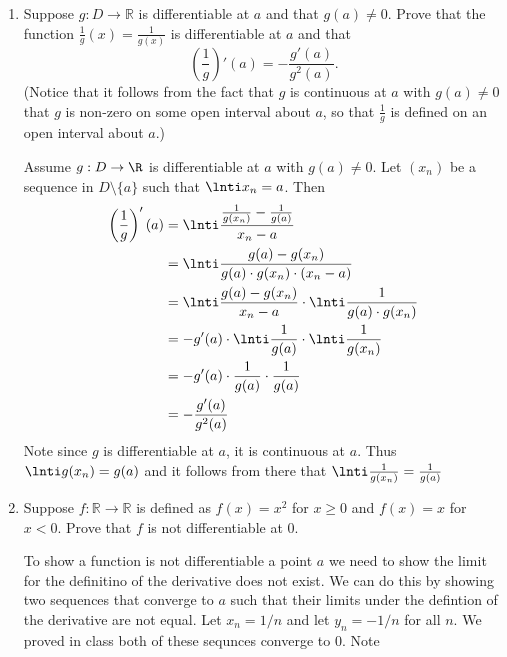 \documentclass[11pt]{exam}
\begin{document}
\begin{enumerate}
        \item Suppose \(g: D \rightarrow \mathbb{R}\) is differentiable at \(a\) and that \(g(a) \neq 0\). Prove that the function \( \frac{1}{g}(x) = \frac{1}{g(x)} \) is differentiable at \(a\) and that 
        \[
        \left( \frac{1}{g} \right)'(a) = -\frac{g'(a)}{g^2(a)}.
        \]
        (Notice that it follows from the fact that \(g\) is continuous at \(a\) with \(g(a) \neq 0\) that \(g\) is non-zero on some open interval about \(a\), so that \(\frac{1}{g}\) is defined on an open interval about \(a\).)
            \begin{solution}
                Assume $g: D \to \R$ is differentiable at $a$ with $g(a) \neq 0$. Let $(x_n)$ be a sequence in $D \setminus \{a\}$ such that $\lnti x_n = a$. Then 
                \begin{align}
                    \left( \frac{1}{g} \right)'(a) &= \lnti \frac{\frac{1}{g(x_n)} - \frac{1}{g(a)}}{x_n - a} \\ &= \lnti \frac{g(a) - g(x_n)}{g(a)\cdot g(x_n)\cdot(x_n-a)} \\
                        &= \lnti \frac{g(a) - g(x_n)}{x_n - a} \cdot \lnti \frac{1}{g(a)\cdot g(x_n)} \\
                        &= -g'(a) \cdot \lnti \frac{1}{g(a)} \cdot \lnti \frac{1}{g(x_n)} \\
                        &= -g'(a) \cdot \frac{1}{g(a)} \cdot \frac{1}{g(a)} \\
                        &= -\frac{g'(a)}{g^2(a)}
                \end{align}
                Note since $g$ is differentiable at $a$, it is continuous at $a$. Thus $\lnti g(x_n) = g(a)$ and 
                it follows from there that $\lnti \frac{1}{g(x_n)} = \frac{1}{g(a)}$
            \end{solution}
        \item Suppose \(f: \mathbb{R} \rightarrow \mathbb{R}\) is defined as \(f(x) = x^2\) for \(x \geq 0\) and \(f(x) = x\) for \(x < 0\). Prove that \(f\) is not differentiable at \(0\).
            \begin{solution}
                To show a function is not differentiable a point $a$ we need to show the limit for the definitino 
                of the derivative does not exist. We can do this by showing  two sequences that converge to $a$ 
                such that their limits under the defintion of the derivative are not equal. Let $x_n = 1/n$ and 
                let $y_n = -1/n$ for all $n$. We proved in class both of these sequnces converge to 0. Note 

\end{solution}
\end{enumerate}
\end{document}
